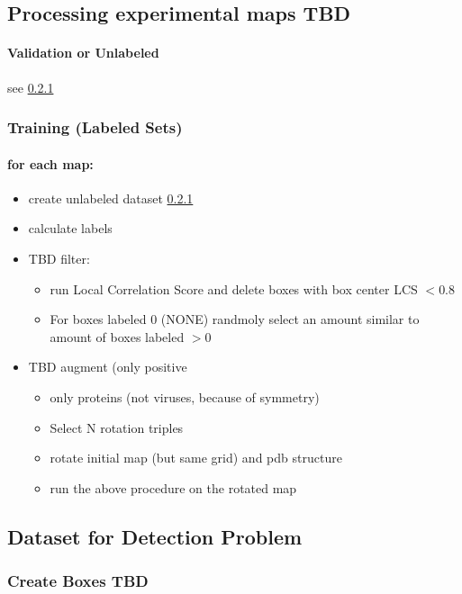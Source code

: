 \subsection{Processing experimental maps {\color{red} TBD}}
\paragraph{Validation or Unlabeled} see \ref{ss:create_boxes}
\subsubsection{Training (Labeled Sets)}
\paragraph{for each map:}
\begin{itemize}
	\item create unlabeled dataset \ref{ss:create_boxes}
	\item calculate labels
	\item {\color{red} TBD} filter: \begin{itemize}
				 \item run Local Correlation Score and delete boxes with box center LCS $<0.8$
				 \item For boxes labeled 0 (NONE) randmoly select an amount similar to amount of boxes labeled $>0$
	
					\end{itemize}
	\item {\color{red} TBD} augment (only positive\begin{itemize}
				 \item only proteins (not viruses, because of symmetry)
				\item Select N rotation triples
				\item rotate initial  map (but same grid) and pdb structure
				\item run the above procedure on the rotated map
					\end{itemize}
\end{itemize}
\subsection{Dataset for Detection Problem}
\subsubsection{Create Boxes {\color{red} TBD}}  \label{ss:create_boxes}
